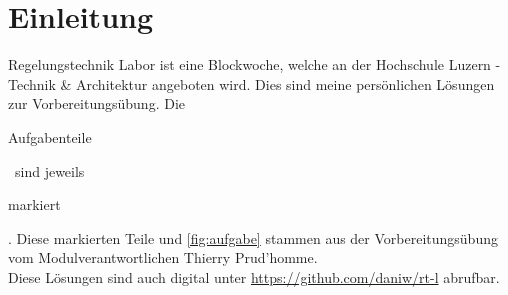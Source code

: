 \section*{Einleitung}
Regelungstechnik Labor ist eine Blockwoche, welche an der Hochschule Luzern - 
Technik \& Architektur angeboten wird. Dies sind meine persönlichen Lösungen 
zur Vorbereitungsübung. Die \begin{aufgabe}Aufgabenteile\end{aufgabe} ~sind 
jeweils \begin{aufgabe}markiert\end{aufgabe}. Diese markierten Teile und 
\autoref{fig:aufgabe} stammen aus der Vorbereitungsübung vom 
Modulverantwortlichen Thierry Prud'homme. \\
Diese Lösungen sind auch digital unter \url{https://github.com/daniw/rt-l} 
abrufbar. 
